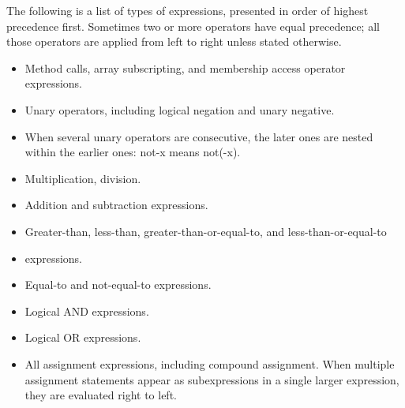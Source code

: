 \begin{homeworkProblem}
	The following is a list of types of expressions, presented in order of highest precedence first. Sometimes two or more operators have equal precedence; all those operators are applied from left to right unless stated otherwise.
	
	\begin{itemize}
		\item Method calls, array subscripting, and membership access operator expressions.
		\item Unary operators, including logical negation and unary negative.
		\item When several unary operators are consecutive, the later ones are nested within the earlier ones: not-x means not(-x).
		\item Multiplication, division.
		\item Addition and subtraction expressions.
		\item Greater-than, less-than, greater-than-or-equal-to, and less-than-or-equal-to
		\item expressions.
		\item Equal-to and not-equal-to expressions.
		\item Logical AND expressions.
		\item Logical OR expressions.
		\item All assignment expressions, including compound assignment. When multiple assignment statements appear as subexpressions in a single larger expression, they are evaluated right to left.
	\end{itemize}

	
\end{homeworkProblem}
